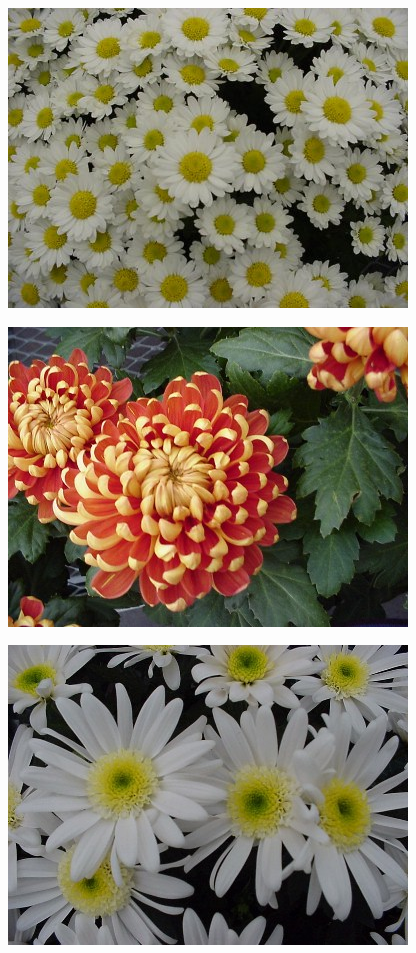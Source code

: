 \documentclass{article}
\begin{document}
\begin{center}
\includegraphics[height=0.9\textheight, angle=90]{../Chrysanthemum_Daisy.jpg}
\end{center}
\newpage

\begin{center}
\includegraphics[height=0.9\textheight, angle=90]{../Chrysanthemum_Incurve.jpg}
\end{center}
\newpage

\begin{center}
\includegraphics[height=0.9\textheight, angle=90]{../Chrysanthemum_Mankato.jpg}
\end{center}
\newpage
\end{document}

